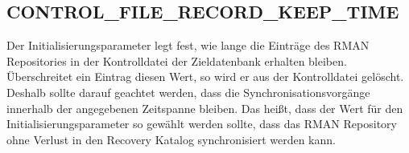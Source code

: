       \subsection{CONTROL\_FILE\_RECORD\_KEEP\_TIME}
        Der Initialisierungsparameter
         legt fest, wie lange die
        Eintr\"age des RMAN Repositories in der Kontrolldatei der Zieldatenbank
        erhalten bleiben. \"Uberschreitet ein Eintrag diesen Wert, so wird er
        aus der Kontrolldatei gel\"oscht. Deshalb sollte darauf geachtet werden,
        dass die Synchronisationsvorg\"ange innerhalb der angegebenen Zeitspanne
        bleiben. Das hei\ss{}t, dass der Wert f\"ur den
        Initialisierungsparameter 
        so gew\"ahlt werden sollte, dass das RMAN Repository ohne Verlust in den
        Recovery Katalog synchronisiert werden kann.
